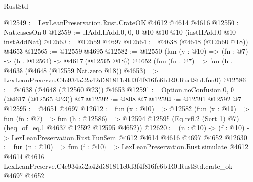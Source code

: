 \begin{lexlean}{RustStd}
\begin{coremodule}
@12549 := LexLeanPreservation.Rust.CrateOK @4612 @4614 @4616
@12550 := Nat.casesOn.{0}
@12559 := HAdd.hAdd.{0, 0, 0} @10 @10 @10 (instHAdd.{0} @10 instAddNat)
@12560 := @12559 @4697
@12564 := @4638 (@4648 (@12560 @18)) @4653
@12565 := @12559 @4695
@12582 := @12550
    (fun (y : @10) => (fn : @7) -> (h : @12564) -> @4617 (@12565 @18))
    @4652
    (fun (fn : @7) =>
    fun (h : @4638 (@4648 (@12559 Nat.zero @18)) @4653) =>
    LexLeanPreserve.C4e934a32a42d381811c0d3f4f816fc6b.R0.RustStd.fun0)
@12586 := @4638 (@4648 (@12560 @23)) @4653
@12591 := Option.noConfusion.{0, 0} (@4617 (@12565 @23)) @7
@12592 := @808 @7
@12594 := @12591 @12592 @7
@12595 := @4651 @4697
@12612 := fun (x : @10) =>
  @12582
    (fun (x : @10) =>
    fun (fn : @7) =>
    fun (h : @12586) =>
    @12594 @12595 (Eq.refl.{2} (Sort 1) @7) (heq_of_eq.{1} @4637 @12592 @12595 @4652))
@12620 := (n : @10) -> (f : @10) -> LexLeanPreservation.Rust.FunSem @4612 @4614 @4616 @4697 @4652
@12630 := fun (n : @10) =>
  fun (f : @10) =>
  LexLeanPreservation.Rust.simulate
    @4612
    @4614
    @4616
    LexLeanPreserve.C4e934a32a42d381811c0d3f4f816fc6b.R0.RustStd.crate_ok
    @4697
    @4652
\end{coremodule}
\end{lexlean}
